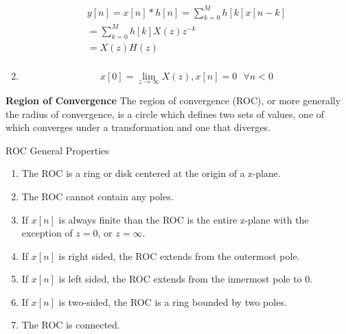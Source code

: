\begin{enumerate}
\begin{equation}
    \begin{gathered}
        y[n] = x[n] * h[n] = \sum\limits_{k = 0}^M {h[k]x[n - k]}  \\ 
         = \sum\limits_{k = 0}^M {h[k]} X(z){z^{ - k}} \\ 
         = X(z)H(z) \\ 
      \end{gathered} 
\end{equation}

\item 
\begin{equation}
    x[0] = \mathop {\lim }\limits_{z \to \infty } X(z),x[n] = 0{\text{ }}\forall n < 0 
\end{equation}

\end{enumerate}

\begin{defn}{\textbf{{Region of Convergence}}}
    The region of convergence (ROC), or more generally the radius of convergence, is a circle which 
    defines two sets of values, one of which converges under a transformation and one that diverges. 
\end{defn}  

ROC General Properties
\begin{enumerate}
    \item The ROC is a ring or disk centered at the origin of a z-plane.
    \item The ROC cannot contain any poles.
    \item If $x[n]$ is always finite than the ROC is the entire z-plane with the exception of $z=0$, or $z=\infty$.
    \item If $x[n]$ is right sided, the ROC extends from the outermost pole.
    \item If $x[n]$ is left sided, the ROC extends from the innermost pole to 0.
    \item If $x[n]$ is two-sided, the ROC is a ring bounded by two poles.
    \item The ROC is connected.
\end{enumerate}